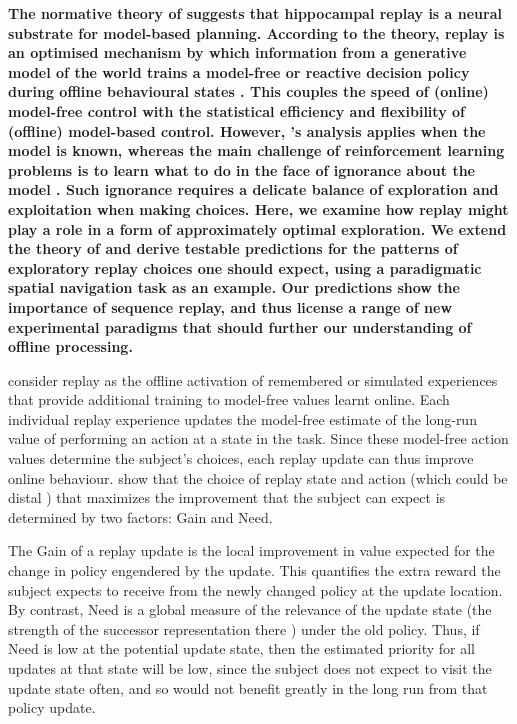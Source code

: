 {\bf The normative theory of \textcite{mattarPrioritizedMemoryAccess2018} suggests that hippocampal replay is a neural substrate for model-based planning. According to the theory, replay is an optimised mechanism by which information from a generative model of the world trains a model-free or reactive decision policy during offline behavioural states \parencite{suttonDynaIntegratedArchitecture1991,moorePrioritizedSweepingReinforcement1993}. This couples the  speed of (online) model-free control with the statistical efficiency and flexibility of (offline) model-based control. However, \textcite{mattarPrioritizedMemoryAccess2018}'s analysis  applies when the model is known, whereas the main challenge of reinforcement learning problems is to learn what to do in the face of ignorance about the model \parencite{kaelblingPlanningActingPartially1998, duffOptimalLearning2002}. Such ignorance requires a delicate balance of exploration and exploitation when making choices. Here, we examine how replay might play a role in a form of approximately optimal exploration. We extend the theory of \textcite{mattarPrioritizedMemoryAccess2018} and derive testable predictions for the patterns of exploratory replay choices one should expect, using a paradigmatic spatial navigation task as an example. Our predictions show the importance of sequence replay, and thus license a range of new experimental paradigms that should further our understanding of offline processing.}

\textcite{mattarPrioritizedMemoryAccess2018} consider replay as the offline activation of remembered or simulated experiences that provide  additional training to  model-free values learnt online. Each individual replay experience updates  the model-free estimate of the long-run value of performing an action  at a state in the task.  Since these model-free action values determine the subject's choices, each replay update can thus improve online behaviour. \textcite{mattarPrioritizedMemoryAccess2018} show that the choice of replay  state and action (which could be distal \parencite{guptaHippocampalReplayNot2010}) that  maximizes the improvement that the subject can expect is determined by two factors: Gain and Need.

The Gain of a replay update is the  local improvement in value  expected for the change in policy engendered by the update.  This quantifies the extra reward the subject expects to receive from the newly changed policy at the update location. By contrast, Need is a global measure of the relevance of the update state (the strength of the successor representation there \parencite{dayanImprovingGeneralizationTemporal1993}) under the old policy. Thus, if Need is low at the potential update state, then the estimated priority for all updates at that state will be low, since the subject does not expect to visit the update state often, and so would not benefit greatly in the long run from that policy update.   

